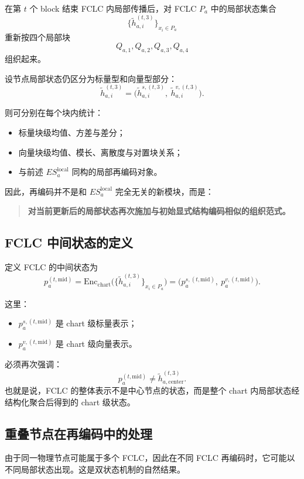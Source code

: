 \documentclass[12pt,a4paper]{ctexart}
\begin{document}
在第 \(t\) 个 block 结束 FCLC 内局部传播后，对 FCLC \(P_a\) 中的局部状态集合
\[
\{\tilde h_{a,i}^{(t,3)}\}_{x_i\in P_a}
\]
重新按四个局部块
\[
Q_{a,1},Q_{a,2},Q_{a,3},Q_{a,4}
\]
组织起来。

设节点局部状态仍区分为标量型和向量型部分：
\[
\tilde h_{a,i}^{(t,3)}
=
\big(
\tilde h_{a,i}^{s,(t,3)},\
\tilde h_{a,i}^{v,(t,3)}
\big).
\]

则可分别在每个块内统计：
\begin{itemize}[leftmargin=2em]
    \item 标量块级均值、方差与差分；
    \item 向量块级均值、模长、离散度与对置块关系；
    \item 与前述 \(ES_a^{\mathrm{local}}\) 同构的局部再编码对象。
\end{itemize}

因此，再编码并不是和 \(ES_a^{\mathrm{local}}\) 完全无关的新模块，而是：
\begin{quote}
\textbf{对当前更新后的局部状态再次施加与初始显式结构编码相似的组织范式。}
\end{quote}

\subsection{FCLC 中间状态的定义}

定义 FCLC 的中间状态为
\[
p_a^{(t,\mathrm{mid})}
=
\mathrm{Enc}_{\mathrm{chart}}
\big(
\{\tilde h_{a,i}^{(t,3)}\}_{x_i\in P_a}
\big)
=
\big(
p_a^{s,(t,\mathrm{mid})},\
p_a^{v,(t,\mathrm{mid})}
\big).
\]

这里：
\begin{itemize}[leftmargin=2em]
    \item \(p_a^{s,(t,\mathrm{mid})}\) 是 chart 级标量表示；
    \item \(p_a^{v,(t,\mathrm{mid})}\) 是 chart 级向量表示。
\end{itemize}

必须再次强调：
\[
p_a^{(t,\mathrm{mid})}\neq \tilde h_{a,\mathrm{center}}^{(t,3)}.
\]
也就是说，FCLC 的整体表示不是中心节点的状态，而是整个 chart 内局部状态经结构化聚合后得到的 chart 级状态。

\subsection{重叠节点在再编码中的处理}

由于同一物理节点可能属于多个 FCLC，因此在不同 FCLC 再编码时，它可能以不同局部状态出现。这是双状态机制的自然结果。
\end{document}
